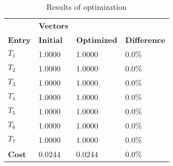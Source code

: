 \begin{table}[H]
\centering
\begin{tabular}{llll}
\textbf{}      & \cellcolor[HTML]{EFEFEF}\textbf{Vectors} & \textbf{} & \textbf{}         \\
\rowcolor[HTML]{EFEFEF} 
\textbf{Entry} & \textbf{Initial} & \textbf{Optimized} & \textbf{Difference} \\
$T_1$ & 1.0000 & 1.0000 & 0.0\% \\ 
$T_2$ & 1.0000 & 1.0000 & 0.0\% \\ 
$T_3$ & 1.0000 & 1.0000 & 0.0\% \\ 
$T_4$ & 1.0000 & 1.0000 & 0.0\% \\ 
$T_5$ & 1.0000 & 1.0000 & 0.0\% \\ 
$T_6$ & 1.0000 & 1.0000 & 0.0\% \\ 
$T_7$ & 1.0000 & 1.0000 & 0.0\% \\ 
\rowcolor[HTML]{EFEFEF} 
\textbf{Cost}  & 0.0244 & 0.0244 & 0.0\% \\ 
\end{tabular}
\caption{Results of optimization}
\label{tab:OptimizationAnalysis}
\end{table}